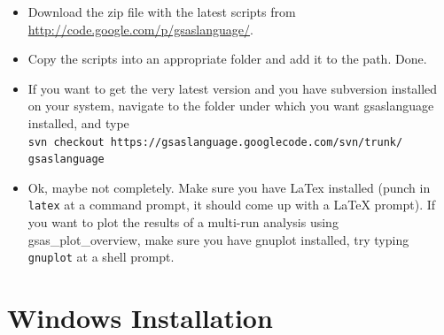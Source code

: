 \begin{itemize}
\item Download the zip file with the latest scripts from \url{http://code.google.com/p/gsaslanguage/}. 
\item Copy the scripts into an appropriate folder and add it to the path. Done.
\item If you want to get the very latest version and you have subversion
installed on your system, navigate to the folder under which you want
gsaslanguage installed, and type\\
\texttt{svn checkout https://gsaslanguage.googlecode.com/svn/trunk/
gsaslanguage}
\item Ok, maybe not completely. Make sure you have LaTex installed (punch in \texttt{latex} at a command prompt, it should come up with a LaTeX prompt). If you want to plot the results of a multi-run analysis using gsas\_plot\_overview, make sure you have gnuplot installed, try typing \texttt{gnuplot} at a shell prompt.
\end{itemize}

\section{Windows Installation}

